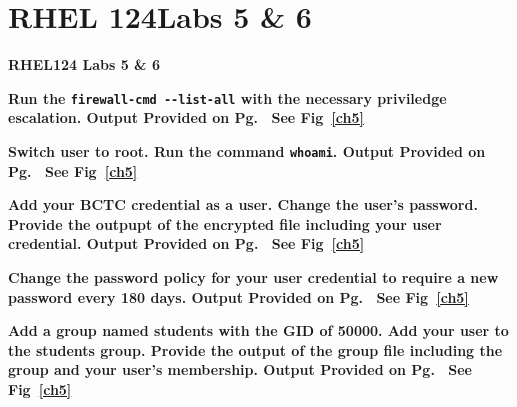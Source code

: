 \documentclass[../CIT217_RHEL124_LabJournal.tex]{subfiles}
\begin{document}

\chapter[RHEL 124 Labs 5 \& 6]{RHEL 124\linebreak[1] Labs 5 \& 6 \hspace*{\fill}{\date}}
\noindent\textbf{{RHEL124 Labs 5 \& 6} }                             

\bf{Run the \verb$firewall-cmd --list-all$ with the necessary priviledge escalation.
Output Provided on Pg.~\pageref{ch5} See Fig~\ref{ch5}}
\hfill\break

\noindent{}
\bf{Switch user to root. Run the command \verb$whoami$. 
Output Provided on Pg.~\pageref{ch5} See Fig~\ref{ch5}}
\hfill\break

\noindent{}
\bf{Add your BCTC credential as a user. Change the user's password. Provide the outpupt
of the encrypted file including your user credential. 
Output Provided on Pg.~\pageref{ch5} See Fig~\ref{ch5}}
\hfill\break

\noindent{}
\bf{Change the password policy for your user credential to require a new password every
180 days. 
Output Provided on Pg.~\pageref{ch5} See Fig~\ref{ch5}}
\hfill\break

\noindent{}
\bf{Add a group named students with the GID of 50000. Add your user to the students
group. Provide the output of the group file including the group and your user's
membership.
Output Provided on Pg.~\pageref{ch5} See Fig~\ref{ch5}}
\end{document}
